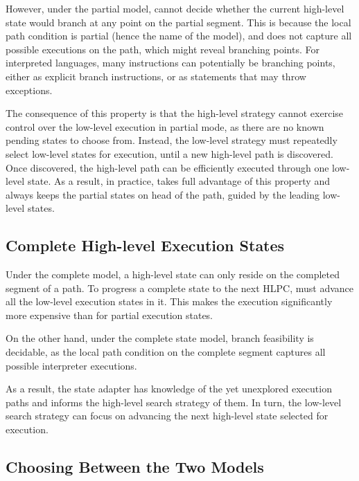 However, under the partial model, \chef cannot decide whether the current high-level state would branch at any point on the partial segment.
%
This is because the local path condition is partial (hence the name of the model), and does not capture all possible executions on the path, which might reveal branching points.  For interpreted languages, many instructions can potentially be branching points, either as explicit branch instructions, or as statements that may throw exceptions.  

The consequence of this property is that the high-level strategy cannot exercise control over the low-level execution in partial mode, as there are no known pending states to choose from.
%
Instead, the low-level strategy must repeatedly select low-level states for execution, until a new high-level path is discovered.
%
Once discovered, the high-level path can be efficiently executed through one low-level state.
%
As a result, in practice, \chef takes full advantage of this property and always keeps the partial states on head of the path, guided by the leading low-level states.

\subsection{Complete High-level Execution States}

Under the complete model, a high-level state can only reside on the completed segment of a path.
%
To progress a complete state to the next HLPC, \chef must advance all the low-level execution states in it.  This makes the execution significantly more expensive than for partial execution states.

On the other hand, under the complete state model, branch feasibility is decidable, as the local path condition on the complete segment captures all possible interpreter executions.

As a result, the state adapter has knowledge of the yet unexplored execution paths and informs the high-level search strategy of them.
%
In turn, the low-level search strategy can focus on advancing the next high-level state selected for execution.

\subsection{Choosing Between the Two Models}

\newcommand{\goodcolor}{\cellcolor{LimeGreen}}
\newcommand{\badcolor}{\cellcolor{Lavender}}

